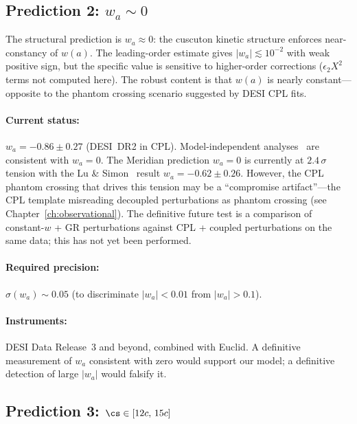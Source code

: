 \subsection{Prediction 2: \texorpdfstring{$w_a \sim 0$}{wa ~ 0}}
\label{sec:1-pred2}

The structural prediction is $w_a \approx 0$: the cuscuton kinetic structure enforces near-constancy of $w(a)$. The leading-order estimate gives $|w_a| \lesssim 10^{-2}$ with weak positive sign, but the specific value is sensitive to higher-order corrections ($\epsilon_2 X^2$ terms not computed here). The robust content is that $w(a)$ is nearly constant---opposite to the phantom crossing scenario suggested by DESI CPL fits.

\paragraph{Current status:} $w_a = -0.86 \pm 0.27$ (DESI~DR2 in CPL). Model-independent analyses~\cite{ch1:hasan25,ch1:mandal25} are consistent with $w_a = 0$. The Meridian prediction $w_a = 0$ is currently at $2.4\,\sigma$ tension with the Lu \& Simon~\cite{ch1:lu-simon} result $w_a = -0.62 \pm 0.26$. However, the CPL phantom crossing that drives this tension may be a ``compromise artifact''---the CPL template misreading decoupled perturbations as phantom crossing (see Chapter~\ref{ch:observational}). The definitive future test is a comparison of constant-$w$ + GR perturbations against CPL + coupled perturbations on the same data; this has not yet been performed.

\paragraph{Required precision:} $\sigma(w_a) \sim 0.05$ (to discriminate $|w_a| < 0.01$ from $|w_a| > 0.1$).

\paragraph{Instruments:} DESI Data Release~3 and beyond, combined with Euclid. A definitive measurement of $w_a$ consistent with zero would support our model; a definitive detection of large $|w_a|$ would falsify it.

\subsection{Prediction 3: \texorpdfstring{$\cs \in [12c,\, 15c]$}{cs in [12c, 15c]}}
\label{sec:1-pred3}


